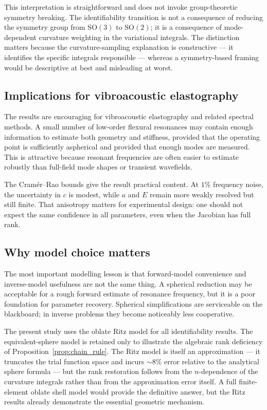 This interpretation is straightforward and does not invoke group-theoretic
symmetry breaking.  The identifiability transition is not a consequence of
reducing the symmetry group from $\mathrm{SO}(3)$ to $\mathrm{SO}(2)$; it is a
consequence of mode-dependent curvature weighting in the variational
integrals.  The distinction matters because the curvature-sampling explanation
is constructive --- it identifies the specific integrals responsible --- whereas
a symmetry-based framing would be descriptive at best and misleading at worst.

\subsection{Implications for vibroacoustic elastography}

The results are encouraging for vibroacoustic elastography and related spectral
methods.  A small number of low-order flexural resonances may contain enough
information to estimate both geometry and stiffness, provided that the operating
point is sufficiently aspherical and provided that enough modes are measured.
This is attractive because resonant frequencies are often easier to estimate
robustly than full-field mode shapes or transient wavefields.

The Cram\'er--Rao bounds give the result practical content.  At $1\%$ frequency
noise, the uncertainty in $c$ is modest, while $a$ and $E$ remain more weakly
resolved but still finite.  That anisotropy matters for experimental design:
one should not expect the same confidence in all parameters, even when the
Jacobian has full rank.

\subsection{Why model choice matters}

The most important modelling lesson is that forward-model convenience and
inverse-model usefulness are not the same thing.  A spherical reduction may be
acceptable for a rough forward estimate of resonance frequency, but it is a poor
foundation for parameter recovery.  Spherical simplifications are serviceable on
the blackboard; in inverse problems they become noticeably less cooperative.

The present study uses the oblate Ritz model for all identifiability results.
The equivalent-sphere model is retained only to illustrate the algebraic rank
deficiency of Proposition~\ref{prop:chain_rule}.  The Ritz model is itself an
approximation --- it truncates the trial function space and incurs $\sim\!8\%$
error relative to the analytical sphere formula --- but the rank restoration
follows from the $n$-dependence of the curvature integrals rather than from
the approximation error itself.  A full finite-element oblate shell
model would provide the definitive answer, but the Ritz results already
demonstrate the essential geometric mechanism.

